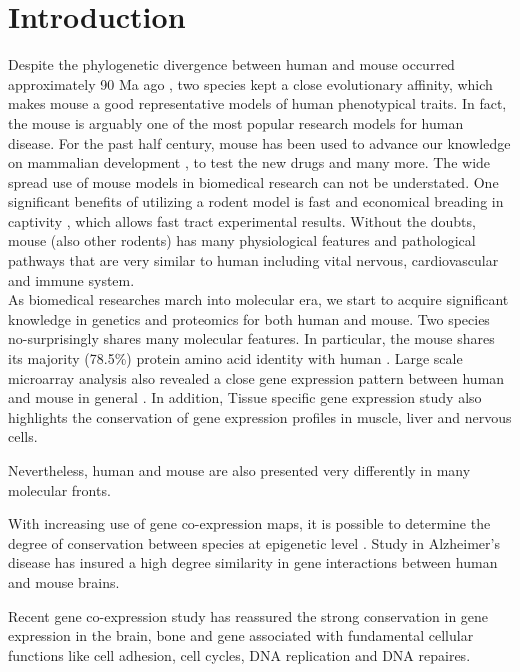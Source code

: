 \section{Introduction}

Despite the phylogenetic divergence between human and mouse occurred approximately 90 Ma ago \cite{Hedges_2006}, two species kept a close evolutionary affinity, which makes mouse a good representative models of human phenotypical traits. In fact, the mouse is arguably one of the most popular research models for human disease. For the past half century, mouse has been used to advance our knowledge on mammalian development \cite{Ueda_2006, Cheon_2011}, to test the new drugs \cite{Van_Dam_2011} and many more. The wide spread use of mouse models in biomedical research can not be understated. \cite{MORSEIII_2007} One significant benefits of utilizing a rodent model is fast and economical breading in captivity \cite{Rosenthal_2007}, which allows fast tract experimental results. \cite{Vandamme_2014} Without the doubts, mouse (also other rodents) has many physiological features and pathological pathways that are very similar to human including vital nervous, cardiovascular and immune system. \cite{MORSEIII_2007,Rosenthal_2007} \\

As biomedical researches march into molecular era, we start to acquire significant knowledge in genetics and proteomics for both human and mouse. Two species no-surprisingly shares many molecular features. In particular, the mouse shares its majority (78.5\%) protein amino acid identity with human \cite{Lindblad_Toh_2001}. Large scale microarray analysis also revealed a close gene expression pattern between human and mouse in general \cite{Liao_2005}. In addition, Tissue specific gene expression study \cite{Zheng_Bradley_2010} also highlights the conservation of gene expression profiles in muscle, liver and nervous cells. 

Nevertheless, human and mouse are also presented very differently in many molecular fronts. 

With increasing use of gene co-expression maps, it is possible to determine the degree of conservation between species at epigenetic level \cite{Stuart_2003,Oldham_2006}. Study in Alzheimer's disease \cite{Miller_2010} has insured a high degree similarity in gene interactions between human and mouse brains.   

Recent gene co-expression study \cite{Monaco_2015} has reassured the strong conservation in gene expression in the brain, bone and gene associated with fundamental cellular functions like cell adhesion, cell cycles, DNA replication and DNA repaires. \cite{Monaco_2015}
\\

